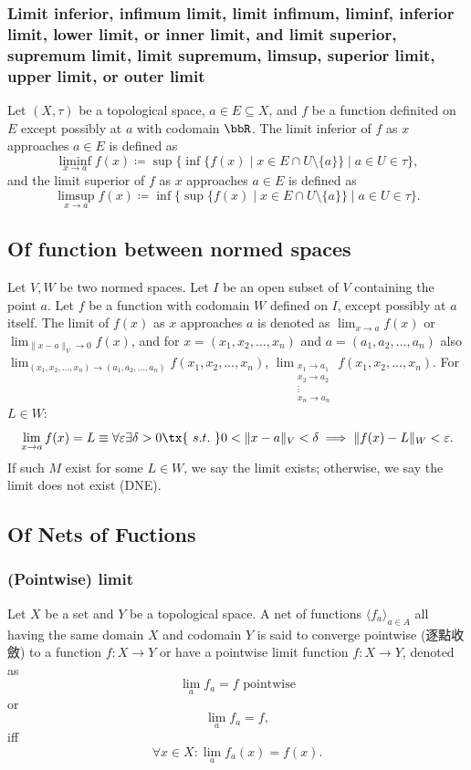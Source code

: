 \subsubsection{Limit inferior, infimum limit, limit infimum, liminf, inferior limit, lower limit, or inner limit, and limit superior, supremum limit, limit supremum, limsup, superior limit, upper limit, or outer limit}
Let $(X,\tau)$ be a topological space, $a\in E\subseteq X$, and $f$ be a function definited on $E$ except possibly at $a$ with codomain $\bbR$. The limit inferior of $f$ as $x$ approaches $a\in E$ is defined as
\[\liminf_{x\to a}f(x)\coloneq\sup\{\inf\{f(x)\mid x\in E\cap U\setminus\{a\}\}\mid a\in U\in\tau\},\]
and the limit superior of $f$ as $x$ approaches $a\in E$ is defined as
\[\limsup_{x\to a}f(x)\coloneq\inf\{\sup\{f(x)\mid x\in E\cap U\setminus\{a\}\}\mid a\in U\in\tau\}.\]
\subsection{Of function between normed spaces}
Let $V,W$ be two normed spaces. Let $I$ be an open subset of $V$ containing the point $a$. Let $f$ be a function with codomain $W$ defined on $I$, except possibly at $a$ itself. The limit of $f(x)$ as $x$ approaches $a$ is denoted as $\lim_{x\to a}f(x)$ or $\lim_{\|x-a\|_V\to0}f(x)$, and for $x=(x_1,x_2,\ldots,x_n)$ and $a=(a_1,a_2,\ldots,a_n)$ also $\lim_{(x_1,x_2,\ldots,x_n)\to(a_1,a_2,\ldots,a_n)}f(x_1,x_2,\ldots,x_n)$, $\lim_{\substack{x_1\to a_1\\x_2\to a_2\\\vdots\\x_n\to a_n}}f(x_1,x_2,\ldots,x_n)$. For $L\in W$:
\[\lim_{x\to a}f(x)=L\equiv\forall\varepsilon\exists\delta>0\tx{\ s.t.\ }0<\|x-a\|_V<\delta\implies\|f(x)-L\|_W<\varepsilon.\]
If such $M$ exist for some $L\in W$, we say the limit exists; otherwise, we say the limit does not exist (DNE).
\subsection{Of Nets of Fuctions}
\subsubsection{(Pointwise) limit}
Let $X$ be a set and $Y$ be a topological space. A net of functions $\langle f_a\rangle_{a\in A}$ all having the same domain $X$ and codomain $Y$ is said to converge pointwise (逐點收斂) to a function $f\colon X\to Y$ or have a pointwise limit function $f\colon X\to Y$, denoted as 
\[\lim_af_a=f\text{\ pointwise}\]
or
\[\lim_af_a=f,\]
iff
\[\forall x\in X\colon\lim_af_a(x)=f(x).\]
